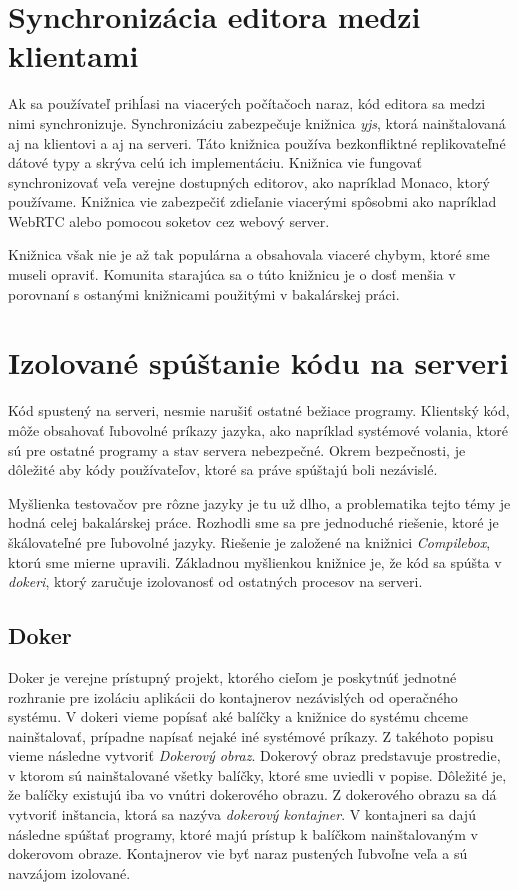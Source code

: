 \section{Synchronizácia editora medzi klientami}
Ak sa používateľ prihĺasi na viacerých počítačoch naraz, kód editora sa medzi nimi synchronizuje. 
Synchronizáciu zabezpečuje knižnica \textit{yjs}, ktorá nainštalovaná aj na klientovi a aj na 
serveri. Táto knižnica používa bezkonfliktné replikovateľné dátové typy a skrýva celú ich 
implementáciu. Knižnica vie fungovať synchronizovať veľa verejne dostupných editorov, ako 
napríklad Monaco, ktorý používame. Knižnica vie zabezpečiť zdieľanie viacerými spôsobmi ako
napríklad WebRTC alebo pomocou soketov cez webový server. 

Knižnica však nie je až tak populárna a obsahovala viaceré chybym, ktoré sme museli opraviť.
Komunita starajúca sa o túto knižnicu je o dosť menšia v porovnaní s ostanými knižnicami použitými v
bakalárskej práci.

\section{Izolované spúštanie kódu na serveri}
Kód spustený na serveri, nesmie narušiť ostatné bežiace programy. Klientský kód, môže obsahovať
ľubovolné príkazy jazyka, ako napríklad systémové volania, ktoré sú pre ostatné programy a stav
servera nebezpečné. Okrem bezpečnosti, je dôležité aby kódy používateľov, ktoré sa práve spúštajú
boli nezávislé.

Myšlienka testovačov pre rôzne jazyky je tu už dlho, a problematika tejto témy je hodná celej
bakalárskej práce. Rozhodli sme sa pre jednoduché riešenie, ktoré je škálovateľné pre ľubovolné
jazyky. Riešenie je založené na knižnici \textit{Compilebox}, ktorú sme mierne upravili. Základnou
myšlienkou knižnice je, že kód sa spúšta v \textit{dokeri}, ktorý zaručuje izolovanosť od ostatných
procesov na serveri. 

\subsection{Doker}
Doker je verejne prístupný projekt, ktorého cieľom je poskytnúť jednotné rozhranie pre izoláciu
aplikácii do kontajnerov nezávislých od operačného systému. V dokeri vieme popísať aké balíčky a
knižnice do systému chceme nainštalovať, prípadne napísať nejaké iné systémové príkazy. Z takéhoto
popisu vieme následne vytvoriť \textit{Dokerový obraz}. Dokerový obraz predstavuje prostredie, v
ktorom sú nainštalované všetky balíčky, ktoré sme uviedli v popise. Dôležité je, že balíčky existujú
iba vo vnútri dokerového obrazu. Z dokerového obrazu sa dá vytvoriť inštancia, ktorá sa nazýva
\textit{dokerový kontajner}. V kontajneri sa dajú následne spúštať programy, ktoré majú prístup k
balíčkom nainštalovaným v dokerovom obraze. Kontajnerov vie byť naraz pustených ľubvoľne veľa a sú
navzájom izolované. 

